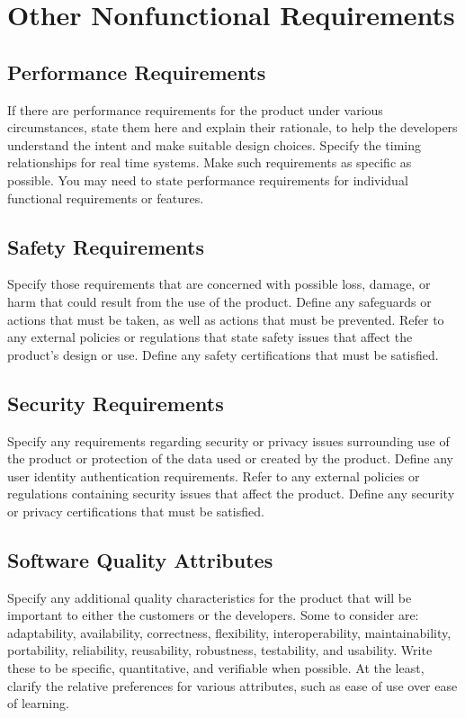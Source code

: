 \chapter{Other Nonfunctional Requirements}


\section{Performance Requirements}

If there are performance requirements for the product under various
circumstances, state them here and explain their rationale, to help
the developers understand the intent and make suitable design
choices. Specify the timing relationships for real time systems. Make
such requirements as specific as possible. You may need to state
performance requirements for individual functional requirements or
features.

\section{Safety Requirements}

Specify those requirements that are concerned with possible loss,
damage, or harm that could result from the use of the product. Define
any safeguards or actions that must be taken, as well as actions that
must be prevented. Refer to any external policies or regulations that
state safety issues that affect the product's design or use. Define
any safety certifications that must be satisfied.

\section{Security Requirements}

Specify any requirements regarding security or privacy issues
surrounding use of the product or protection of the data used or
created by the product. Define any user identity authentication
requirements. Refer to any external policies or regulations containing
security issues that affect the product. Define any security or
privacy certifications that must be satisfied.

\section{Software Quality Attributes}

Specify any additional quality characteristics for the product that
will be important to either the customers or the developers. Some to
consider are: adaptability, availability, correctness, flexibility,
interoperability, maintainability, portability, reliability,
reusability, robustness, testability, and usability. Write these to be
specific, quantitative, and verifiable when possible. At the least,
clarify the relative preferences for various attributes, such as ease
of use over ease of learning.
